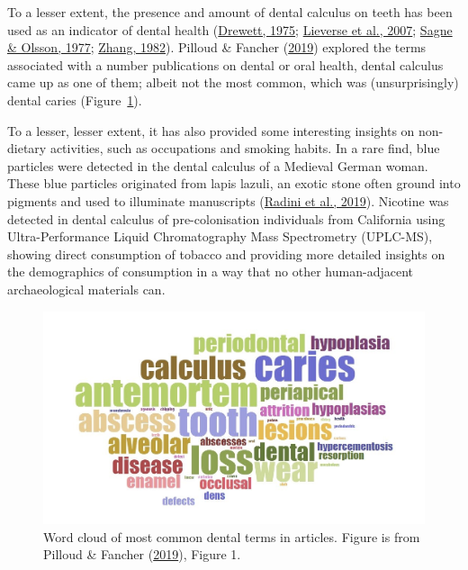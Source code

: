 \documentclass[
  b5paper,
]{book}
\begin{document}
To a lesser extent, the presence and amount of dental calculus on teeth
has been used as an indicator of dental health
(\protect\hyperlink{ref-drewettExcavationOval1975}{Drewett, 1975};
\protect\hyperlink{ref-lieverseDentalHealth2007}{Lieverse et al., 2007};
\protect\hyperlink{ref-sagneStudiesPeriodontal1977}{Sagne \& Olsson,
1977}; \protect\hyperlink{ref-zhangDentalDisease1982}{Zhang, 1982}).
Pilloud \& Fancher
(\protect\hyperlink{ref-pilloudOutliningDefinition2019}{2019}) explored
the terms associated with a number publications on dental or oral
health, dental calculus came up as one of them; albeit not the most
common, which was (unsurprisingly) dental caries
(Figure~\ref{fig-dental-terms}).

To a lesser, lesser extent, it has also provided some interesting
insights on non-dietary activities, such as occupations and smoking
habits. In a rare find, blue particles were detected in the dental
calculus of a Medieval German woman. These blue particles originated
from lapis lazuli, an exotic stone often ground into pigments and used
to illuminate manuscripts
(\protect\hyperlink{ref-radiniMedievalWomen2019}{Radini et al., 2019}).
Nicotine was detected in dental calculus of pre-colonisation individuals
from California using Ultra-Performance Liquid Chromatography Mass
Spectrometry (UPLC-MS), showing direct consumption of tobacco and
providing more detailed insights on the demographics of consumption in a
way that no other human-adjacent archaeological materials can.

\begin{figure}

{\centering \includegraphics{figures/wordcloud.png}

}

\caption{\label{fig-dental-terms}Word cloud of most common dental terms
in articles. Figure is from Pilloud \& Fancher
(\protect\hyperlink{ref-pilloudOutliningDefinition2019}{2019}), Figure
1.}

\end{figure}
\end{document}
